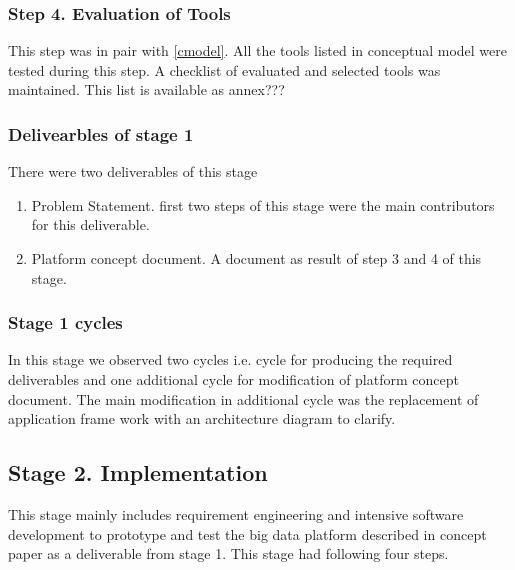 \subsubsection{Step 4. Evaluation of Tools}
This step was in pair with \ref{cmodel}. All the tools listed in conceptual model were tested during this step. A checklist of evaluated and selected tools was maintained. This list is available as annex???

\subsubsection{Delivearbles of stage 1}
There were two deliverables of this stage
\begin{enumerate}
\item Problem Statement. first two steps of this stage were the main contributors for this deliverable.
\item Platform concept document. A document as result of step 3 and 4 of this stage. 
\end{enumerate}

\subsubsection{Stage 1 cycles}
In this stage we observed two cycles i.e. cycle for producing the required deliverables and one additional cycle for modification of platform concept document. The main modification in additional cycle was the replacement of application frame work with an architecture diagram to clarify.
\subsection{Stage 2. Implementation}
This stage mainly includes requirement engineering and intensive software development to prototype and test the big data platform described in concept paper as a deliverable from stage 1. This stage had following four steps.
